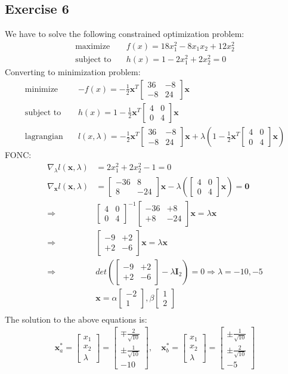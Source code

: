\documentclass[11pt]{article}
\newcommand{\V}[1]{\pmb{#1}}
\newcommand{\mat}[1]{\begin{bmatrix}#1\end{bmatrix}}
\begin{document}
\subsection*{Exercise 6} 
We have to solve the following constrained optimization problem:
\begin{align*}
 \text{maximize} \quad& f(x) = 18x_1^2 - 8x_1x_2 +12x_2^2\\
 \text{subject to} \quad& h(x)= 1 - 2x_1^2 + 2x_2^2 = 0
\end{align*}
Converting to minimization problem:
\begin{align*}
 \text{minimize} \quad& -f(x) = -\frac{1}{2}\V{x}^T\mat{36& -8\\-8& 24}\V{x}\\
 \text{subject to} \quad& h(x)= 1 - \frac{1}{2}\V{x}^T\mat{4&0\\0&4}\V{x}\\
 \text{lagrangian}\quad& l(x,\lambda) = -\frac{1}{2}\V{x}^T\mat{36& -8\\-8& 24}\V{x} + \lambda(1 - \frac{1}{2}\V{x}^T\mat{4&0\\0&4}\V{x})
\end{align*}
FONC:
\begin{align*}
 \nabla_{\lambda} l(\V{x},\lambda)&= 2x_1^2 + 2x_2^2-1 = 0\\
 \nabla_{\V{x}} l(\V{x},\lambda) &= 
 \mat{-36& 8\\8& -24}\V{x} - \lambda(\mat{4&0\\0&4}\V{x})=\V{0}\\
 \Rightarrow& \mat{4&0\\0&4}^{-1}\mat{-36& +8\\+8& -24}\V{x} = \lambda\V{x}\\
 \Rightarrow& \mat{-9& +2\\+2& -6}\V{x} = \lambda\V{x}\\
 \Rightarrow& det(\mat{-9& +2\\+2& -6}-\lambda \V{I}_2) = 0
 \Rightarrow \lambda = -10,-5\\ 
 & \V{x} = \alpha\mat{-2\\1}, \beta\mat{1\\2}\\
\end{align*}
The solution to the above equations is:
\begin{align*}
 \V{x}^*_a = \mat{x_1\\x_2\\\lambda}=\mat{\mp\frac{2}{\sqrt{10}} \\ \pm\frac{1}{\sqrt{10}}\\-10},\quad 
 \V{x}^*_b =\mat{x_1\\x_2\\\lambda}=\mat{\pm\frac{1}{\sqrt{10}} \\ \pm\frac{2}{\sqrt{10}}\\-5}
\end{align*}
\end{document}
